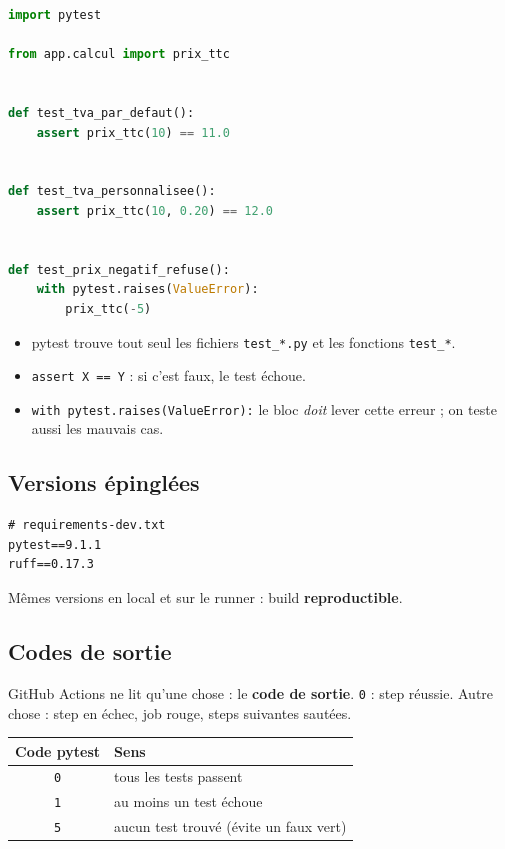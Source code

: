 \documentclass[11pt,a4paper]{article}
\newcommand{\cmd}[1]{\texttt{#1}}
\begin{document}
\begin{lstlisting}[language=Python]
import pytest

from app.calcul import prix_ttc


def test_tva_par_defaut():
    assert prix_ttc(10) == 11.0


def test_tva_personnalisee():
    assert prix_ttc(10, 0.20) == 12.0


def test_prix_negatif_refuse():
    with pytest.raises(ValueError):
        prix_ttc(-5)
\end{lstlisting}

\begin{itemize}
  \item pytest trouve tout seul les fichiers \cmd{test\_*.py} et les fonctions \cmd{test\_*}.
  \item \cmd{assert X == Y} : si c'est faux, le test échoue.
  \item \cmd{with pytest.raises(ValueError):} le bloc \emph{doit} lever cette erreur ; on teste aussi les mauvais cas.
\end{itemize}

\subsection{Versions épinglées}
\begin{lstlisting}
# requirements-dev.txt
pytest==9.1.1
ruff==0.17.3
\end{lstlisting}
Mêmes versions en local et sur le runner : build \textbf{reproductible}.

\subsection{Codes de sortie}
GitHub Actions ne lit qu'une chose : le \textbf{code de sortie}. \cmd{0} : step réussie. Autre chose : step en échec, job rouge, steps suivantes sautées.

\begin{center}
\begin{tabular}{@{}cl@{}}
\toprule
\textbf{Code pytest} & \textbf{Sens} \\
\midrule
\cmd{0} & tous les tests passent \\
\cmd{1} & au moins un test échoue \\
\cmd{5} & aucun test trouvé (évite un faux vert) \\
\bottomrule
\end{tabular}
\end{center}
\end{document}
